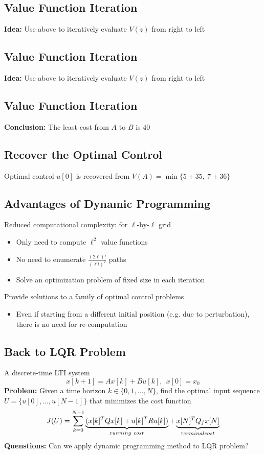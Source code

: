 \documentclass[10pt,a4paper,oneside]{article}
\begin{document}
\subsection{Value Function Iteration}
{\bfseries Idea: }Use above to iteratively evaluate $V(z)$ from right to left
\subsection{Value Function Iteration}
{\bfseries Idea: }Use above to iteratively evaluate $V(z)$ from right to left
\subsection{Value Function Iteration}
{\bfseries Conclusion: }The least cost from $A$ to $B$ is 40
\subsection{Recover the Optimal Control}
Optimal control $u[0]$ is recovered from $V(A) = \min\{5+35,\ 7+36\}$ 
\subsection{Advantages of Dynamic Programming}
Reduced computational complexity: for $\ell$-by-$\ell$ grid
\begin{itemize}
	\item Only need to compute $\ell^2$ value functions
	\item No need to enumerate $\frac{(2\ell)!}{(\ell!)^2}$ paths
	\item Solve an optimization problem of fixed size in each iteration
\end{itemize}
Provide solutions to a family of optimal control problems
\begin{itemize}
	\item Even if starting from a different initial position (e.g. due to perturbation), there is no need for re-computation
\end{itemize}
\subsection{Back to LQR Problem}
A discrete-time LTI system
\[
x[k+1]=Ax[k]+Bu[k], \ \ x[0]=x_0
\]
{\bfseries Problem: }Given a time horizon $k\in\{0,1,...,N\}$, find the optimal input sequence $U=\{u[0],...,u[N-1]\}$ that minimizes the cost function
\[
J(U)=\sum_{k=0}^{N-1}\underbrace{(x[k]^TQx[k]+u[k]^TRu[k])}_{\text running \ cost}+\underbrace{x[N]^TQ_fx[N]}_{\text terminal cost}
\]
{\bfseries Quenstions: }Can we apply dynamic programming method to LQR problem?
\end{document}
